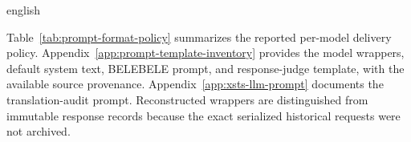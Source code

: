 \begin{otherlanguage*}{english}



Table~\ref{tab:prompt-format-policy} summarizes the reported per-model delivery policy. Appendix~\ref{app:prompt-template-inventory} provides the model wrappers, default system text, BELEBELE prompt, and response-judge template, with the available source provenance. Appendix~\ref{app:xsts-llm-prompt} documents the translation-audit prompt. Reconstructed wrappers are distinguished from immutable response records because the exact serialized historical requests were not archived.


\end{otherlanguage*}
